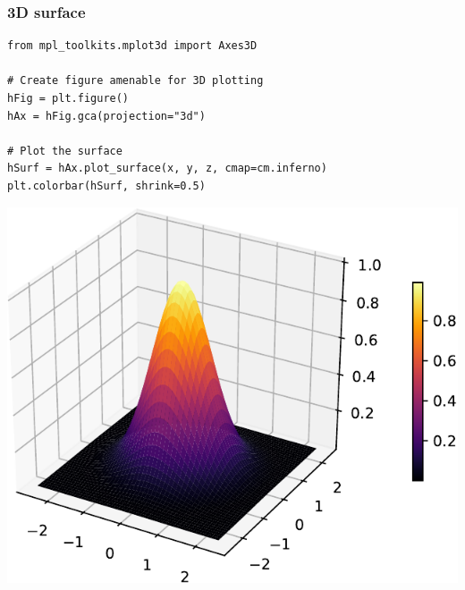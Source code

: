 \documentclass[pdf]{beamer}
\begin{document}
\begin{frame}[fragile]
\frametitle{3D surface}

\tiny
\begin{lstlisting}[style=python]
from mpl_toolkits.mplot3d import Axes3D

# Create figure amenable for 3D plotting
hFig = plt.figure()
hAx = hFig.gca(projection="3d")

# Plot the surface
hSurf = hAx.plot_surface(x, y, z, cmap=cm.inferno)
plt.colorbar(hSurf, shrink=0.5)
\end{lstlisting}

\vspace{-0.8cm}
\begin{center}
	\includegraphics[width=.42\textwidth]{plot6.pdf}
\end{center}

\end{frame}

\end{document}
